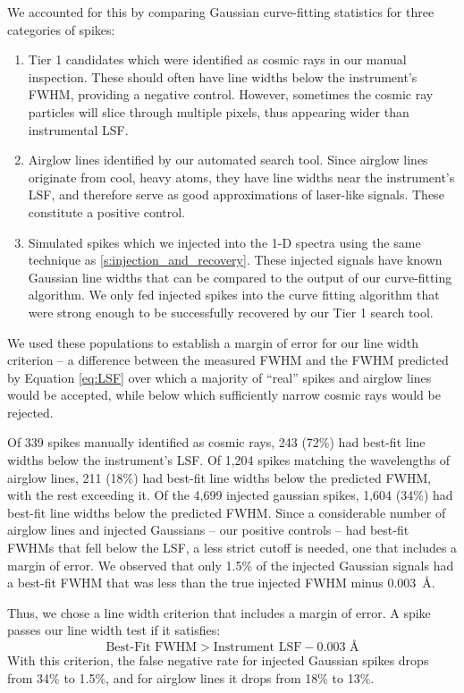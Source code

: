 \documentclass[twocolumn]{aastex701}
\begin{document}
We accounted for this by comparing Gaussian curve-fitting statistics for three categories of spikes: 
\begin{enumerate}
    \item Tier 1 candidates which were identified as cosmic rays in our manual inspection.  These should often have line widths below the instrument's FWHM, providing a negative control.  However, sometimes the cosmic ray particles will slice through multiple pixels, thus appearing wider than instrumental LSF.
    \item Airglow lines identified by our automated search tool.  Since airglow lines originate from cool, heavy atoms, they have line widths near the instrument's LSF, and therefore serve as good approximations of laser-like  signals. These constitute a positive control.
    \item Simulated spikes which we injected into the 1-D spectra using the same technique as \ref{s:injection_and_recovery}.  These injected signals have known Gaussian line widths that can be compared to the output of our curve-fitting algorithm.  We only fed injected spikes into the curve fitting algorithm that were strong enough to be successfully recovered by our Tier 1 search tool. 
\end{enumerate}

We used these populations to establish a margin of error for our line width criterion -- a difference between the measured FWHM and the FWHM predicted by Equation \ref{eq:LSF} over which a majority of \enquote{real} spikes and airglow lines would be accepted, while below which sufficiently narrow cosmic rays would be rejected.

Of 339 spikes manually identified as cosmic rays, 243 (72\%) had best-fit line widths below the instrument's LSF.  Of 1,204 spikes matching the wavelengths of airglow lines, 211 (18\%) had best-fit line widths below the predicted FWHM, with the rest exceeding it.  Of the 4,699 injected gaussian spikes, 1,604 (34\%) had best-fit line widths below the predicted FWHM.  Since a considerable number of airglow lines and injected Gaussians -- our positive controls -- had best-fit FWHMs that fell below the LSF, a less strict cutoff is needed, one that includes a margin of error.  We observed that only 1.5\% of the injected Gaussian signals had a best-fit FWHM  that was less than the true injected FWHM minus 0.003~\AA.  

Thus, we chose a line width criterion that includes a margin of error.  A spike passes our line width test if it satisfies:
\begin{equation}
    \mbox{Best-Fit FWHM} > \mbox{Instrument LSF} - 0.003 \mbox{~\AA}
    \label{eq:linewidth}
\end{equation}
With this criterion, the false negative rate for injected Gaussian spikes drops from 34\% to 1.5\%, and for airglow lines it drops from 18\% to 13\%.   
\end{document}
